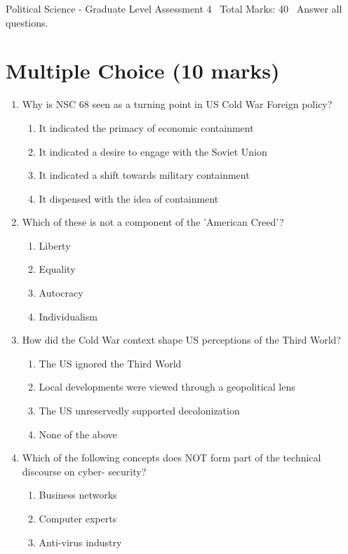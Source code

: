 \documentclass[12pt]{article}
\begin{document}
\begin{center}
Political Science - Graduate Level Assessment 4 \
Total Marks: 40 \
Answer all questions.
\end{center}

\section*{Multiple Choice (10 marks)}
\begin{enumerate}[label=\arabic*.]
\item Why is NSC 68 seen as a turning point in US Cold War Foreign policy?
\begin{enumerate}[label=(\alph*)]
    \item It indicated the primacy of economic containment
    \item It indicated a desire to engage with the Soviet Union
    \item It indicated a shift towards military containment
    \item It dispensed with the idea of containment
\end{enumerate}
\item Which of these is not a component of the 'American Creed'?
\begin{enumerate}[label=(\alph*)]
    \item Liberty
    \item Equality
    \item Autocracy
    \item Individualism
\end{enumerate}
\item How did the Cold War context shape US perceptions of the Third World?
\begin{enumerate}[label=(\alph*)]
    \item The US ignored the Third World
    \item Local developments were viewed through a geopolitical lens
    \item The US unreservedly supported decolonization
    \item None of the above
\end{enumerate}
\item Which of the following concepts does NOT form part of the technical discourse on cyber- security?
\begin{enumerate}[label=(\alph*)]
    \item Business networks
    \item Computer experts
    \item Anti-virus industry

\end{enumerate}
\end{enumerate}
\end{document}
